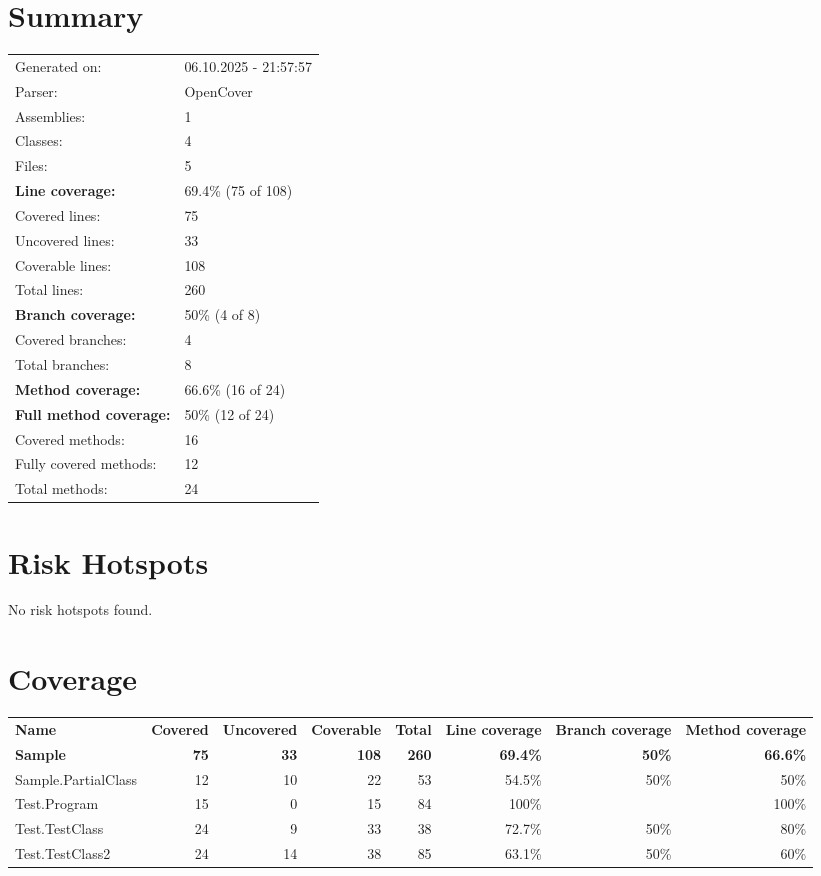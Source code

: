 \documentclass[a4paper,landscape,10pt]{article}
\begin{document}
\setcounter{secnumdepth}{-1}
\section{Summary}
\begin{longtable}[l]{ll}
Generated on: & 06.10.2025 - 21:57:57\\
Parser: & OpenCover\\
Assemblies: & 1\\
Classes: & 4\\
Files: & 5\\
\textbf{Line coverage:} & 69.4\% (75 of 108)\\
Covered lines: & 75\\
Uncovered lines: & 33\\
Coverable lines: & 108\\
Total lines: & 260\\
\textbf{Branch coverage:} & 50\% (4 of 8)\\
Covered branches: & 4\\
Total branches: & 8\\
\textbf{Method coverage:} & 66.6\% (16 of 24)\\
\textbf{Full method coverage:} & 50\% (12 of 24)\\
Covered methods: & 16\\
Fully covered methods: & 12\\
Total methods: & 24\\
\end{longtable}
\section{Risk Hotspots}
No risk hotspots found.
\section{Coverage}
\begin{longtable}[l]{|l|r|r|r|r|r|r|r|}
\textbf{Name} & \textbf{Covered} & \textbf{Uncovered} & \textbf{Coverable} & \textbf{Total} & \textbf{Line coverage} & \textbf{Branch coverage} & \textbf{Method coverage}\\
\textbf{Sample} & \textbf{75} & \textbf{33} & \textbf{108} & \textbf{260} & \textbf{69.4\%} & \textbf{50\%} & \textbf{66.6\%}\\
Sample.PartialClass & 12 & 10 & 22 & 53 & 54.5\% & 50\% & 50\%\\
Test.Program & 15 & 0 & 15 & 84 & 100\% &  & 100\%\\
Test.TestClass & 24 & 9 & 33 & 38 & 72.7\% & 50\% & 80\%\\
Test.TestClass2 & 24 & 14 & 38 & 85 & 63.1\% & 50\% & 60\%\\
\end{longtable}
\newpage
\end{document}
